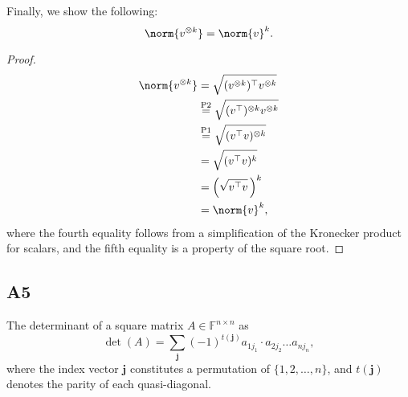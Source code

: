 \documentclass[11pt]{article}
\newcommand{\field}{\mathbb{F}} %
\newcommand{\kp}{\otimes} %
\begin{document}
Finally, we show the following:
\[
\norm{v^{\kp k}} = \norm{v}^k.
\]
\begin{proof}
\begin{align*}
\norm{v^{\kp k}} &= \sqrt{(v^{\kp k})^\top v^{\kp k}}\\
&\overset{\textnormal{P2}}{=} \sqrt{(v^\top)^{\kp k} v^{\kp k}}\\
&\overset{\textnormal{P1}}{=} \sqrt{(v^\top v)^{\kp k}}\\
&= \sqrt{(v^\top v)^k}\\
&= \Big(\sqrt{v^\top v}\,\Big)^k\\
&= \norm{v}^k,
\end{align*}
where the fourth equality follows from a simplification of the Kronecker product for scalars, and the fifth equality is a property of the square root.
\end{proof}

\subsection*{A5}
The determinant of a square matrix \(A \in \field^{n \times n}\) as
\[
\det(A) = \sum_{\bm{j}}(-1)^{t(\bm{j})} a_{1 j_1} \cdot a_{2 j_2} \dots a_{n j_n},
\]
where the index vector \(\bm{j}\) constitutes a permutation of \(\{1, 2, \dots, n\}\), and \(t(\bm{j})\) denotes the parity of each quasi-diagonal.
\end{document}
